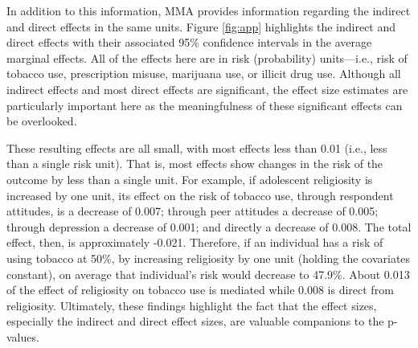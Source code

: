 \documentclass[]{article}
\newenvironment{Shaded}{\begin{snugshade}}{\end{snugshade}}
\newcommand{\KeywordTok}[1]{\textcolor[rgb]{0.13,0.29,0.53}{\textbf{#1}}}
\newcommand{\DataTypeTok}[1]{\textcolor[rgb]{0.13,0.29,0.53}{#1}}
\newcommand{\DecValTok}[1]{\textcolor[rgb]{0.00,0.00,0.81}{#1}}
\newcommand{\StringTok}[1]{\textcolor[rgb]{0.31,0.60,0.02}{#1}}
\newcommand{\ControlFlowTok}[1]{\textcolor[rgb]{0.13,0.29,0.53}{\textbf{#1}}}
\newcommand{\OperatorTok}[1]{\textcolor[rgb]{0.81,0.36,0.00}{\textbf{#1}}}
\newcommand{\NormalTok}[1]{#1}
\begin{document}
In addition to this information, MMA provides information regarding the
indirect and direct effects in the same units. Figure \ref{fig:app}
highlights the indirect and direct effects with their associated 95\%
confidence intervals in the average marginal effects. All of the effects
here are in risk (probability) units---i.e., risk of tobacco use,
prescription misuse, marijuana use, or illicit drug use. Although all
indirect effects and most direct effects are significant, the effect
size estimates are particularly important here as the meaningfulness of
these significant effects can be overlooked.

These resulting effects are all small, with most effects less than 0.01
(i.e., less than a single risk unit). That is, most effects show changes
in the risk of the outcome by less than a single unit. For example, if
adolescent religiosity is increased by one unit, its effect on the risk
of tobacco use, through respondent attitudes, is a decrease of 0.007;
through peer attitudes a decrease of 0.005; through depression a
decrease of 0.001; and directly a decrease of 0.008. The total effect,
then, is approximately -0.021. Therefore, if an individual has a risk of
using tobacco at 50\%, by increasing religiosity by one unit (holding
the covariates constant), on average that individual's risk would
decrease to 47.9\%. About 0.013 of the effect of religiosity on tobacco
use is mediated while 0.008 is direct from religiosity. Ultimately,
these findings highlight the fact that the effect sizes, especially the
indirect and direct effect sizes, are valuable companions to the
p-values.

\begin{Shaded}
\end{Shaded}
\end{document}
